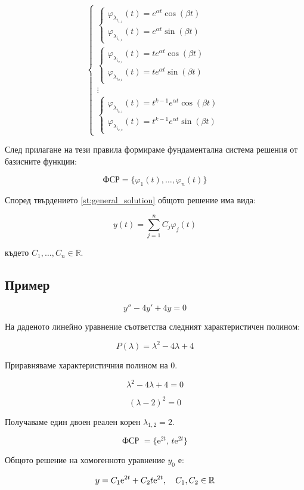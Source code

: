 \documentclass{scrartcl}
\begin{document}
\begin{FlushLeft}
\begin{enumerate}
    $$
    \begin{cases}
        \begin{cases}
            \varphi_{\lambda_{i_{1, 1}}}(t) = e^{\alpha t}\cos{(\beta t)}\\
            \varphi_{\lambda_{i_{1, 2}}}(t) = e^{\alpha t}\sin{(\beta t)}
        \end{cases}\\
        \begin{cases}
            \varphi_{\lambda_{i_{2, 1}}}(t) = te^{\alpha t}\cos{(\beta t)}\\
            \varphi_{\lambda_{i_{2, 2}}}(t) = te^{\alpha t}\sin{(\beta t)}
        \end{cases}\\
        \vdots\\
        \begin{cases}
            \varphi_{\lambda_{i_{k, 1}}}(t) = t^{k-1}e^{\alpha t}\cos{(\beta t)}\\
            \varphi_{\lambda_{i_{k, 2}}}(t) = t^{k-1}e^{\alpha t}\sin{(\beta t)}
        \end{cases}
    \end{cases}
    $$
\end{enumerate}

След прилагане на тези правила формираме фундаментална система решения от базисните функции:

$$\text{ФСР} = \{\varphi_1(t), \dots, \varphi_n(t)\}$$

Според твърдението \ref{st:general_solution} общото решение има вида:

$$y(t) = \sum_{j=1}^n C_j \varphi_j(t)$$

където $C_1, \dots, C_n \in \mathbb{R}$.

\subsection{Пример}

$$y'' - 4y' + 4y = 0$$

На даденото линейно уравнение съответства следният характеристичен полином:

$$P(\lambda) = \lambda^2 -4 \lambda + 4$$

Приравняваме характеристичния полином на $0$.

$$\lambda^2 - 4\lambda + 4 = 0$$

$$(\lambda - 2)^2 = 0$$

Получаваме един двоен реален корен $\lambda_{1,2} = 2$.

$$\text{ФСР }=\lbrace \mathrm{e}^{2t}, \, t\mathrm{e}^{2t} \rbrace$$

Общото решение на хомогенното уравнение $y_0$ е:

$$y = C_1 \mathrm{e}^{2t} + C_2 t\mathrm{e}^{2t}, \quad C_1, \space C_2 \in \mathbb{R}$$

\end{FlushLeft}
\end{document}
